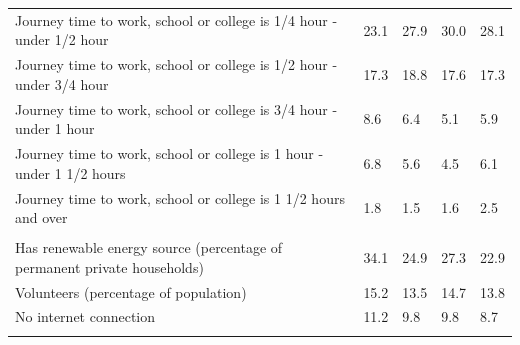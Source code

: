 \documentclass{article}
\begin{document}
\begin{table}[h]
\begin{tabular}{KTTTT}
Journey time to work, school or college is 1/4 hour - under 1/2 hour & 23.1& 27.9& 30.0& 28.1\\
Journey time to work, school or college is 1/2 hour - under 3/4 hour & 17.3& 18.8& 17.6& 17.3\\
Journey time to work, school or college is 3/4 hour - under 1 hour & 8.6& 6.4& 5.1& 5.9\\
Journey time to work, school or college is 1 hour - under 1 1/2 hours & 6.8& 5.6& 4.5& 6.1\\
Journey time to work, school or college is 1 1/2 hours and over & 1.8& 1.5& 1.6& 2.5\\
\hline
    \\ 
    \hline
Has renewable energy source (percentage of permanent private households) & 34.1& 24.9& 27.3& 22.9\\
    \hline
Volunteers (percentage of population) & 15.2& 13.5& 14.7& 13.8\\
    \hline
No internet connection& 11.2&  9.8&  9.8&  8.7\\
\hline
\end{tabular}
\end{table}
\end{document}
